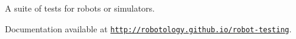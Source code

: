 A suite of tests for robots or simulators.

Documentation available at \href{http://robotology.github.io/robot-testing}{\tt http\+://robotology.\+github.\+io/robot-\/testing}. 